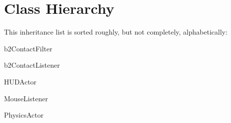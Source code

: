 \section{Class Hierarchy}
This inheritance list is sorted roughly, but not completely, alphabetically\-:\begin{DoxyCompactList}
\item b2\-Contact\-Filter\begin{DoxyCompactList}
\item {}
\end{DoxyCompactList}
\item b2\-Contact\-Listener\begin{DoxyCompactList}
\item {}
\end{DoxyCompactList}
\item {}
\item {}
\item H\-U\-D\-Actor\begin{DoxyCompactList}
\item {}
\end{DoxyCompactList}
\item {}
\item {}
\item {}
\item {}
\item Mouse\-Listener\begin{DoxyCompactList}
\item {}
\end{DoxyCompactList}
\item Physics\-Actor\begin{DoxyCompactList}
\item {}
\begin{DoxyCompactList}
\item {}

\end{DoxyCompactList}
\end{DoxyCompactList}
\end{DoxyCompactList}
